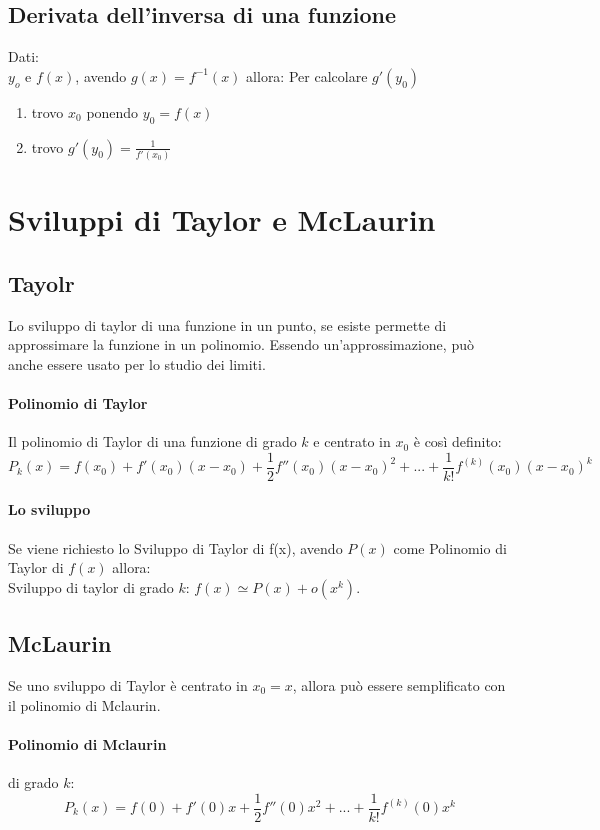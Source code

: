 \documentclass[12pt, a4paper, openany]{book}
\begin{document}
\subsection{Derivata dell'inversa di una funzione}
Dati:\\
$y_o$ e $f(x)$, avendo $g(x) = f^{-1}(x)$ allora:
Per calcolare $g'(y_0)$
\begin{enumerate}
	\item trovo $x_0$ ponendo $y_0=f(x)$
	\item trovo $g'(y_0)=\frac{1}{f'(x_0)}$
\end{enumerate}

\section{Sviluppi di Taylor e McLaurin}

\subsection{Tayolr}
Lo sviluppo di taylor di una funzione in un punto, se esiste permette di approssimare la funzione in un polinomio.
Essendo un'approssimazione, può anche essere usato per lo studio dei limiti.


\paragraph{Polinomio di Taylor} Il polinomio di Taylor di una funzione di grado $k$ e centrato in $x_0$ è così definito:
$$P_k(x)=f(x_0)+f'(x_0)(x-x_0) + \frac{1}{2}f''(x_0)(x-x_0)^2 +... + \frac{1}{k!}f^{(k)}(x_0)(x-x_0)^k$$

\paragraph*{Lo sviluppo} Se viene richiesto lo Sviluppo di Taylor di f(x), avendo $P(x)$ come Polinomio di Taylor di $f(x)$ allora:
\\Sviluppo di taylor di grado $k$: $f(x) \simeq P(x) + o(x^k)$.

\subsection{McLaurin}
Se uno sviluppo di Taylor è centrato in $x_0=x$, allora può essere semplificato con il polinomio di Mclaurin.
\paragraph*{Polinomio di Mclaurin} di grado $k$:
$$P_k(x)=f(0)+f'(0)x+\frac{1}{2}f''(0)x^2+...+\frac{1}{k!}f^{(k)}(0)x^k$$
\end{document}
